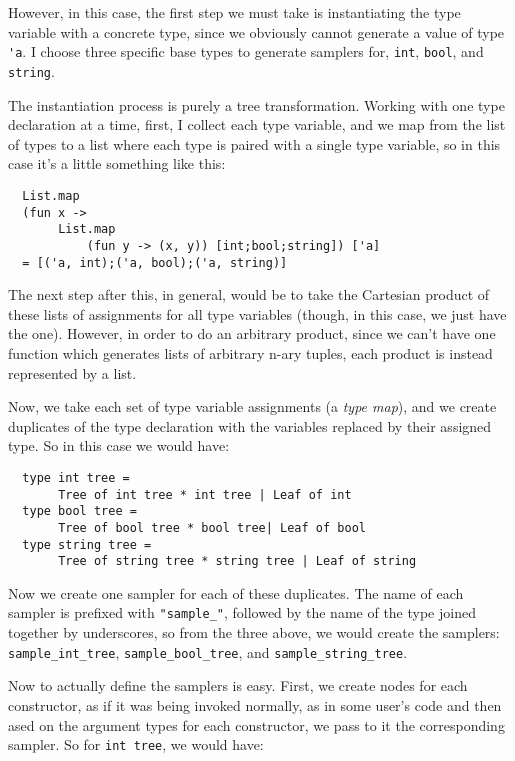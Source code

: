 \documentclass[11pt]{article} %
\begin{document}
However, in this case, the first step we must take is instantiating the type variable with a concrete type, since we obviously cannot generate a value of type \verb+'a+. I choose three specific base types to generate samplers for, \verb+int+, \verb+bool+, and \verb+string+.

The instantiation process is purely a tree transformation. Working with one type declaration at a time, first, I collect each type variable, and we map from the list of types to a list where each type is paired with a single type variable, so in this case it's a little something like this:

\begin{lstlisting}
  List.map
  (fun x ->
       List.map
           (fun y -> (x, y)) [int;bool;string]) ['a]
  = [('a, int);('a, bool);('a, string)]
\end{lstlisting}

The next step after this, in general, would be to take the Cartesian product of these lists of assignments for all type variables (though, in this case, we just have the one). However, in order to do an arbitrary product, since we can't have one function which generates lists of arbitrary n-ary tuples, each product is instead represented by a list.

Now, we take each set of type variable assignments (a \textit{type map}), and we create duplicates of the type declaration with the variables replaced by their assigned type. So in this case we would have:

\begin{lstlisting}
  type int tree =
       Tree of int tree * int tree | Leaf of int
  type bool tree =
       Tree of bool tree * bool tree| Leaf of bool
  type string tree =
       Tree of string tree * string tree | Leaf of string
\end{lstlisting}

Now we create one sampler for each of these duplicates. The name of each sampler is prefixed with \verb+"sample_"+, followed by the name of the type joined together by underscores, so from the three above, we would create the samplers: \verb+sample_int_tree+, \verb+sample_bool_tree+, and \verb+sample_string_tree+.

Now to actually define the samplers is easy. First, we create nodes for each constructor, as if it was being invoked normally, as in some user's code and then ased on the argument types for each constructor, we pass to it the corresponding sampler. So for \verb+int tree+, we would have:
\end{document}
